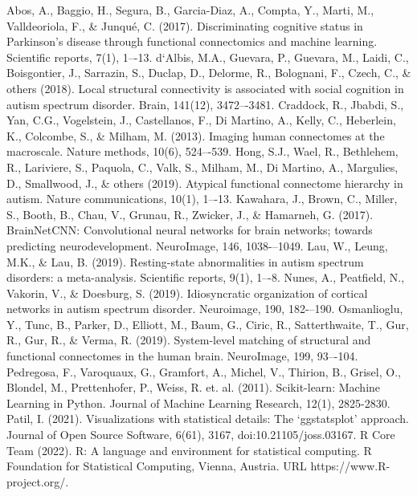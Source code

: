 \documentclass[10pt,conference]{IEEEtran}
\begin{document}
\begin{thebibliography}{00}
     {Abos, A., Baggio, H., Segura, B., Garcia-Diaz, A., Compta, Y., Marti, M., Valldeoriola, F., \& Junqué, C. (2017). Discriminating cognitive status in Parkinson’s disease through functional connectomics and machine learning. Scientific reports, 7(1), 1–-13.}
     {d`Albis, M.A., Guevara, P., Guevara, M., Laidi, C., Boisgontier, J., Sarrazin, S., Duclap, D., Delorme, R., Bolognani, F., Czech, C., \& others (2018). Local structural connectivity is associated with social cognition in autism spectrum disorder. Brain, 141(12), 3472–-3481.}
     {Craddock, R., Jbabdi, S., Yan, C.G., Vogelstein, J., Castellanos, F., Di Martino, A., Kelly, C., Heberlein, K., Colcombe, S., \& Milham, M. (2013). Imaging human connectomes at the macroscale. Nature methods, 10(6), 524–-539.}
     {Hong, S.J., Wael, R., Bethlehem, R., Lariviere, S., Paquola, C., Valk, S., Milham, M., Di Martino, A., Margulies, D., Smallwood, J., \& others (2019). Atypical functional connectome hierarchy in autism. Nature communications, 10(1), 1–-13.}
     {Kawahara, J., Brown, C., Miller, S., Booth, B., Chau, V., Grunau, R., Zwicker, J., \& Hamarneh, G. (2017). BrainNetCNN: Convolutional neural networks for brain networks; towards predicting neurodevelopment. NeuroImage, 146, 1038-–1049.}
     {Lau, W., Leung, M.K., \& Lau, B. (2019). Resting-state abnormalities in autism spectrum disorders: a meta-analysis. Scientific reports, 9(1), 1–-8.}
     {Nunes, A., Peatfield, N., Vakorin, V., \& Doesburg, S. (2019). Idiosyncratic organization of cortical networks in autism spectrum disorder. Neuroimage, 190, 182-–190.}
     {Osmanlioglu, Y., Tunc, B., Parker, D., Elliott, M., Baum, G., Ciric, R., Satterthwaite, T., Gur, R., Gur, R., \& Verma, R. (2019). System-level matching of structural and functional connectomes in the human brain. NeuroImage, 199, 93–-104.}
     {Pedregosa, F., Varoquaux, G., Gramfort, A., Michel, V., Thirion, B., Grisel, O., Blondel, M., Prettenhofer, P., Weiss, R. et. al. (2011). Scikit-learn: Machine Learning in Python. Journal of Machine Learning Research, 12(1), 2825-2830.}
     {Patil, I. (2021). Visualizations with statistical details: The `ggstatsplot' approach. Journal of Open Source Software, 6(61), 3167, doi:10.21105/joss.03167.}
     {R Core Team (2022). R: A language and environment for statistical computing. R Foundation for Statistical Computing, Vienna, Austria. URL https://www.R-project.org/.}

\end{thebibliography}
\end{document}
